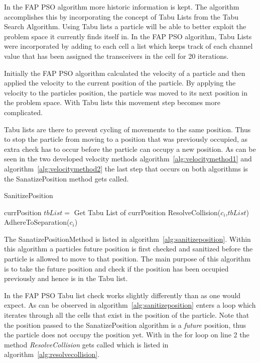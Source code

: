In the FAP PSO algorithm more historic information is kept. The algorithm accomplishes this by incorporating the concept of Tabu Lists from the Tabu Search Algorithm. Using Tabu lists a particle will be able to better exploit the problem space it currently finds itself in. In the FAP PSO algorithm, Tabu Lists were incorporated by adding to each cell a list which keeps track of each channel value that has been assigned the transceivers in the cell for 20 iterations.

Initially the FAP PSO algorithm calculated the velocity of a particle and then applied the velocity to the current position of the particle. By applying the velocity to the particles position, the particle was moved to its next position in the problem space. With Tabu lists this movement step becomes more complicated.

Tabu lists are there to prevent cycling of movements to the same position. Thus to stop the particle from moving to a position that was previously occupied, as extra check has to occur before the particle can occupy a new position. As can be seen in the two developed velocity methods algorithm~\ref{alg:velocitymethod1} and algorithm~\ref{alg:velocitymethod2} the last step that occurs on both algorithms is the SanatizePosition method gets called.

\begin{algorithm}
\caption{SanitizePosition}
\label{alg:sanitizeposition}
\begin{algorithmic}[1]
	\REQUIRE currPosition
		\STATE $tbList = $ Get Tabu List of currPosition
		\STATE ResolveCollision($c_i$,$tbList$)
		\STATE AdhereToSeparation($c_i$)
	\ENDFOR
\end{algorithmic}
\end{algorithm}

The SanatizePositionMethod is listed in algorithm~\ref{alg:sanitizeposition}. Within this algorithm a particles future position is first checked and sanitized before the particle is allowed to move to that position. The main purpose of this algorithm is to take the future position and check if the position has been occupied previously and hence is in the Tabu list.

In the FAP PSO Tabu list check works slightly differently than as one would expect. As can be observed in algorithm~\ref{alg:sanitizeposition} enters a loop which iterates through all the cells that exist in the position of the particle. Note that the position passed to the SanatizePosition algorithm is a \emph{future} position, thus the particle does not occupy the position yet. With in the for loop on line 2 the method \emph{ResolveCollision} gets called which is listed in algorithm~\ref{alg:resolvecollision}.

